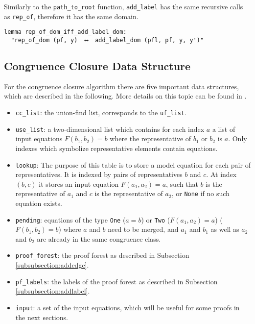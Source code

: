Similarly to the \lstinline{path_to_root} function, \lstinline{add_label} has the same recursive calls as \lstinline{rep_of}, therefore it has the same domain.

\begin{lstlisting}
lemma rep_of_dom_iff_add_label_dom:
  "rep_of_dom (pf, y)  ⟷  add_label_dom (pfl, pf, y, y')"
\end{lstlisting}

\subsection{Congruence Closure Data Structure}
\label{subsection:datastructure}

For the congruence closure algorithm there are five important data structures, which are described in the following. More details on this topic can be found in \cite{Nieuwenhuis}.

\begin{itemize}
	\item \lstinline{cc_list}: the union-find list, corresponds to the \lstinline{uf_list}.

	\item \lstinline{use_list}: a two-dimensional list which contains for each index $a$ a list of input equations $F(b_1, b_2) = b$ where the representative of $b_1$ or $b_2$ is $a$.
    Only indexes which symbolize representative elements contain equations.

	\item \lstinline{lookup}: The purpose of this table is to store a model equation for each pair of representatives. It is indexed by pairs of representatives $b$ and $c$. At index $(b,c)$ it stores an input equation $F(a_1, a_2) = a$, such that $b$ is the representative of $a_1$ and $c$ is the representative of $a_2$, or \lstinline{None} if no such equation exists.

    \item \lstinline{pending}: equations of the type \lstinline{One} ($a = b$) or \lstinline{Two} ($F(a_1, a_2) = a$) ($F(b_1, b_2) = b$) where $a$ and $b$ need to be merged, and $a_1$ and $b_1$ as well as $a_2$ and $b_2$ are already in the same congruence class.

    \item \lstinline{proof_forest}: the proof forest as described in Subsection \ref{subsubsection:addedge}.

    \item \lstinline{pf_labels}: the labels of the proof forest as described in Subsection \ref{subsubsection:addlabel}.

    \item \lstinline{input}: a set of the input equations, which will be useful for some proofs in the next sections.
\end{itemize}

